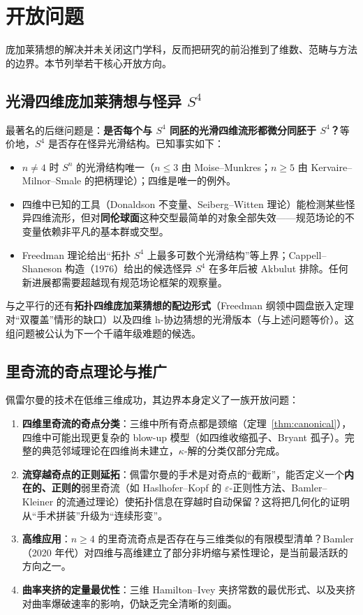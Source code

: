 \section{开放问题}\label{sec:open_problems}

庞加莱猜想的解决并未关闭这门学科，反而把研究的前沿推到了维数、范畴与方法的边界。本节列举若干核心开放方向。

\subsection{光滑四维庞加莱猜想与怪异 $S^4$}

最著名的后继问题是：\textbf{是否每个与 $S^4$ 同胚的光滑四维流形都微分同胚于 $S^4$？}等价地，$S^4$ 是否存在怪异光滑结构。已知事实如下：

\begin{itemize}
    \item $n \neq 4$ 时 $S^n$ 的光滑结构唯一（$n \leq 3$ 由 Moise--Munkres；$n \geq 5$ 由 Kervaire--Milnor--Smale 的把柄理论）；四维是唯一的例外。
    \item 四维中已知的工具（Donaldson 不变量、Seiberg--Witten 理论）能检测某些怪异四维流形，但对\textbf{同伦球面}这种交型最简单的对象全部失效——规范场论的不变量依赖非平凡的基本群或交型。
    \item Freedman 理论给出“拓扑 $S^4$ 上最多可数个光滑结构”等上界；Cappell--Shaneson 构造（1976）给出的候选怪异 $S^4$ 在多年后被 Akbulut 排除。任何新进展都需要超越现有规范场论框架的观察量。
\end{itemize}

与之平行的还有\textbf{拓扑四维庞加莱猜想的配边形式}（Freedman 纲领中圆盘嵌入定理对“双覆盖”情形的缺口）以及四维 h-协边猜想的光滑版本（与上述问题等价）。这组问题被公认为下一个千禧年级难题的候选。

\subsection{里奇流的奇点理论与推广}

佩雷尔曼的技术在低维三维成功，其边界本身定义了一族开放问题：

\begin{enumerate}[label=(\arabic*)]
    \item \textbf{四维里奇流的奇点分类}：三维中所有奇点都是颈缩（定理~\ref{thm:canonical}），四维中可能出现更复杂的 blow-up 模型（如四维收缩孤子、Bryant 孤子）。完整的典范邻域理论在四维尚未建立，$\kappa$-解的分类仅部分完成。
    \item \textbf{流穿越奇点的正则延拓}：佩雷尔曼的手术是对奇点的“截断”，能否定义一个\textbf{内在的、正则的}弱里奇流（如 Haslhofer--Kopf 的 $\varepsilon$-正则性方法、Bamler--Kleiner 的流通过理论）使拓扑信息在穿越时自动保留？这将把几何化的证明从“手术拼装”升级为“连续形变”。
    \item \textbf{高维应用}：$n \geq 4$ 的里奇流奇点是否存在与三维类似的有限模型清单？Bamler（2020 年代）对四维与高维建立了部分非坍缩与紧性理论，是当前最活跃的方向之一。
    \item \textbf{曲率夹挤的定量最优性}：三维 Hamilton--Ivey 夹挤常数的最优形式、以及夹挤对曲率爆破速率的影响，仍缺乏完全清晰的刻画。
\end{enumerate}

